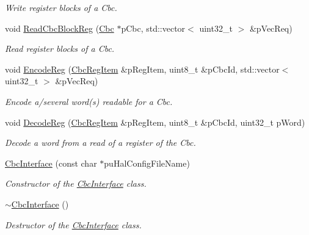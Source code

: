 \begin{DoxyCompactItemize}
\begin{DoxyCompactList}\small\item\em Write register blocks of a Cbc. \end{DoxyCompactList}\item 
void \hyperlink{class_ph2___hw_interface_1_1_cbc_interface_ac9ec0a962f0527a8298c1771240bf838}{Read\-Cbc\-Block\-Reg} (\hyperlink{class_ph2___hw_description_1_1_cbc}{Cbc} $\ast$p\-Cbc, std\-::vector$<$ uint32\-\_\-t $>$ \&p\-Vec\-Req)
\begin{DoxyCompactList}\small\item\em Read register blocks of a Cbc. \end{DoxyCompactList}\item 
void \hyperlink{class_ph2___hw_interface_1_1_cbc_interface_a2718fb251129aef788f6068c53dd1b44}{Encode\-Reg} (\hyperlink{struct_ph2___hw_description_1_1_cbc_reg_item}{Cbc\-Reg\-Item} \&p\-Reg\-Item, uint8\-\_\-t \&p\-Cbc\-Id, std\-::vector$<$ uint32\-\_\-t $>$ \&p\-Vec\-Req)
\begin{DoxyCompactList}\small\item\em Encode a/several word(s) readable for a Cbc. \end{DoxyCompactList}\item 
void \hyperlink{class_ph2___hw_interface_1_1_cbc_interface_acf2c23c04d1f48b3d1ad875d63e6b98e}{Decode\-Reg} (\hyperlink{struct_ph2___hw_description_1_1_cbc_reg_item}{Cbc\-Reg\-Item} \&p\-Reg\-Item, uint8\-\_\-t \&p\-Cbc\-Id, uint32\-\_\-t p\-Word)
\begin{DoxyCompactList}\small\item\em Decode a word from a read of a register of the Cbc. \end{DoxyCompactList}\item 
\hyperlink{class_ph2___hw_interface_1_1_cbc_interface_a3ddefe5549da06a7d26fee1502a792b4}{Cbc\-Interface} (const char $\ast$pu\-Hal\-Config\-File\-Name)
\begin{DoxyCompactList}\small\item\em Constructor of the \hyperlink{class_ph2___hw_interface_1_1_cbc_interface}{Cbc\-Interface} class. \end{DoxyCompactList}\item 
\hyperlink{class_ph2___hw_interface_1_1_cbc_interface_a1f0ab7d7cf7783a0fe275e8e1d7e5a49}{$\sim$\-Cbc\-Interface} ()
\begin{DoxyCompactList}\small\item\em Destructor of the \hyperlink{class_ph2___hw_interface_1_1_cbc_interface}{Cbc\-Interface} class. \end{DoxyCompactList}\item 

\end{DoxyCompactItemize}
